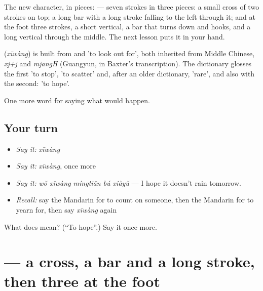 The new character, in pieces:  — seven strokes in three pieces: a small cross of two strokes on top; a long bar with a long stroke falling to the left through it; and at the foot three strokes, a short vertical, a bar that turns down and hooks, and a long vertical through the middle. The next lesson puts it in your hand.

\begin{cousinweb}
\textbf{} (\emph{xīwàng}) is built from  and  'to look out for', both inherited from Middle Chinese, \emph{xj+j} and \emph{mjangH} (Guangyun, in Baxter's transcription). The dictionary glosses the first 'to stop', 'to scatter' and, after an older dictionary, 'rare', and also with the second: 'to hope'.
\end{cousinweb}

\begin{grammarlens}[title={What you've built}]
One more word for saying what would happen.
\end{grammarlens}

\subsection*{Your turn}
\begin{itemize}
\raggedright
  \item \emph{Say it:} \emph{xīwàng}
  \item \emph{Say it:} \emph{xīwàng}, once more
  \item \emph{Say it:} \emph{wǒ xīwàng míngtiān bú xiàyǔ} — I hope it doesn't rain tomorrow.
  \item \emph{Recall:} say the Mandarin for to count on someone, then the Mandarin for to yearn for, then say \emph{xīwàng} again
\end{itemize}

\begin{tcolorbox}[breakable,colback=teal!4,colframe=teal!35!black,title={Before you move on}]
What does  mean? (\textquotedblleft{}To hope\textquotedblright{}.) Say it once more.
\end{tcolorbox}
\section[\texorpdfstring{\zh{希} (xī)}{希 (xī)}]{ — a cross, a bar and a long stroke, then three at the foot}

\label{lesson:ZH-W533-xi-hope}



